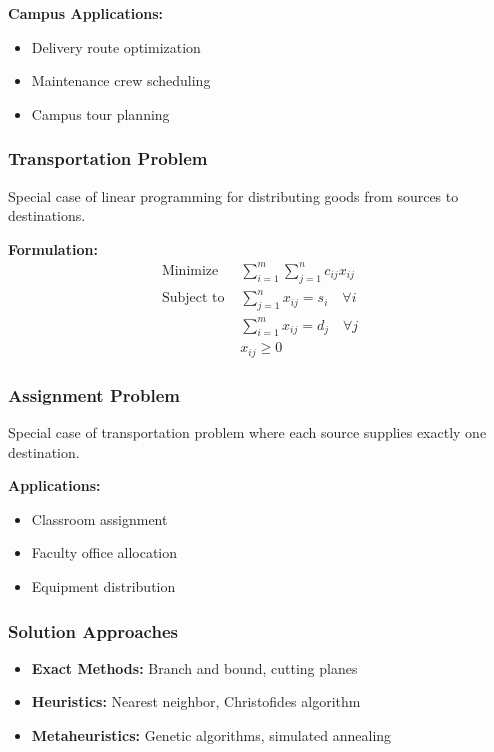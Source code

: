 \documentclass[
  letterpaper,
  DIV=11,
  numbers=noendperiod]{scrreprt}
\providecommand{\tightlist}{%
  \setlength{\itemsep}{0pt}\setlength{\parskip}{0pt}}
\begin{document}
\textbf{Campus Applications:}

\begin{itemize}
\tightlist
\item
  Delivery route optimization
\item
  Maintenance crew scheduling
\item
  Campus tour planning
\end{itemize}

\subsubsection{Transportation Problem}\label{transportation-problem}

Special case of linear programming for distributing goods from sources
to destinations.

\textbf{Formulation:} \[
\begin{aligned}
\text{Minimize } & \sum_{i=1}^m \sum_{j=1}^n c_{ij} x_{ij} \\
\text{Subject to } & \sum_{j=1}^n x_{ij} = s_i \quad \forall i \\
& \sum_{i=1}^m x_{ij} = d_j \quad \forall j \\
& x_{ij} \geq 0
\end{aligned}
\]

\subsubsection{Assignment Problem}\label{assignment-problem}

Special case of transportation problem where each source supplies
exactly one destination.

\textbf{Applications:}

\begin{itemize}
\tightlist
\item
  Classroom assignment
\item
  Faculty office allocation
\item
  Equipment distribution
\end{itemize}

\subsubsection{Solution Approaches}\label{solution-approaches}

\begin{itemize}
\tightlist
\item
  \textbf{Exact Methods:} Branch and bound, cutting planes
\item
  \textbf{Heuristics:} Nearest neighbor, Christofides algorithm
\item
  \textbf{Metaheuristics:} Genetic algorithms, simulated annealing
\end{itemize}
\end{document}
